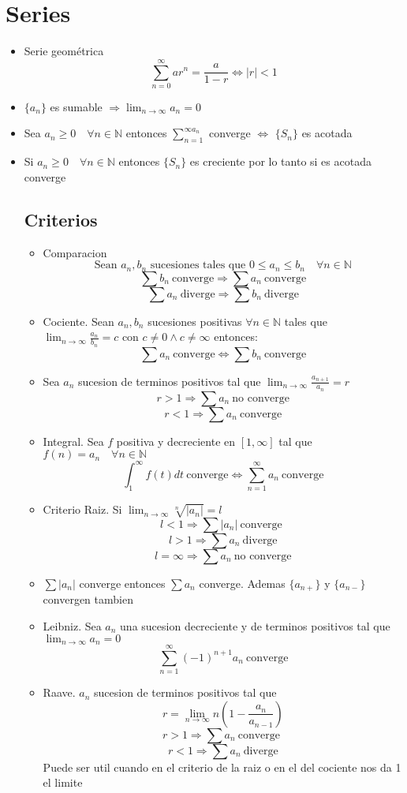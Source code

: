 \documentclass{article}
\theoremstyle{break}
\def \N{\mathbb{N}}
\begin{document}
	\section{Series}
	\begin{itemize}
		\item Serie geométrica
			\[\sum_{n=0}^{\infty}ar^n = \frac{a}{1-r} \iff |r|<1\]
		\item $\{a_n\}$ es sumable $\Longrightarrow \lim_{n\rightarrow \infty}a_n = 0$
		\item Sea $a_n \geq 0\quad\forall n\in\N $ entonces $\sum_{n=1}^{\infty a_n}$ converge $\iff $ $\{S_n\}$ es acotada
		\item Si $a_n \geq 0 \quad\forall n\in\N$ entonces $\{S_n\}$ es creciente por lo tanto si es acotada converge
	\subsection{Criterios}
	\begin{itemize}
		\item Comparacion 
			\[\text{Sean } a_n,b_n \text{ sucesiones tales que } 0\leq a_n\leq b_n \quad \forall n\in\N\]
			\[\sum b_n \ \text{converge}\Longrightarrow \sum a_n \ \text{converge} \]
			\[\sum a_n \ \text{diverge}\Longrightarrow\sum b_n \ \text{diverge}\]
		\item Cociente. Sean $a_n,b_n$ sucesiones positivas $\forall n\in\N$ tales que $\lim_{n\rightarrow \infty}\frac{a_n}{b_n}= c$ 
			con $c\neq 0 \land c\neq \infty$ entonces:
			\[\sum a_n \ \text{converge}\iff \sum b_n \ \text{converge}\]
		\item Sea $a_n$ sucesion de terminos positivos tal que $\lim_{n\rightarrow \infty}\frac{a_{n+1}}{a_n}=r$ 
			\[r>1 \Longrightarrow\sum a_n\ \text{no converge}\]
			\[r<1 \Longrightarrow\sum a_n\ \text{converge}\]
		\item Integral. Sea $f$ positiva y decreciente en $[1,\infty]$ tal que $f(n)=a_n \quad \forall n\in\N$
			\[\int_{1}^{\infty}f(t)dt \ \text{converge}\iff \sum_{n=1}^{\infty}a_n \ \text{converge}\]
		\item Criterio Raiz. Si $\lim_{n\rightarrow \infty} \sqrt[n]{|a_n|} = l$
			\[l<1 \Longrightarrow \sum |a_n|\ \text{converge }\]
			\[l>1 \Longrightarrow\sum a_n \ \text{diverge}\]
			\[l=\infty \Longrightarrow\sum a_n \ \text{no converge}\]
		\item $\sum |a_n|$ converge entonces $\sum a_n$ converge. Ademas $\{a_{n+}\}$ y $\{a_{n-}\}$ convergen tambien
		\item Leibniz. Sea $a_n$ una sucesion decreciente y de terminos positivos tal que $\lim_{n\rightarrow \infty}a_n = 0$
			\[\sum_{n=1}^{\infty} (-1)^{n+1}a_n\ \text{converge}\]
		\item Raave. $a_n$ sucesion de terminos positivos tal que 
			\[r=\lim_{n\rightarrow \infty }n(1-\frac{a_n}{a_{n-1}})\]
			\[r>1 \Longrightarrow\sum a_n\ \text{converge }\]
			\[r<1 \Longrightarrow\sum a_n\ \text{diverge}\]
			Puede ser util cuando en el criterio de la raiz o en el del cociente nos da 1 el limite
	\end{itemize}
	\end{itemize}
	
\end{document}
